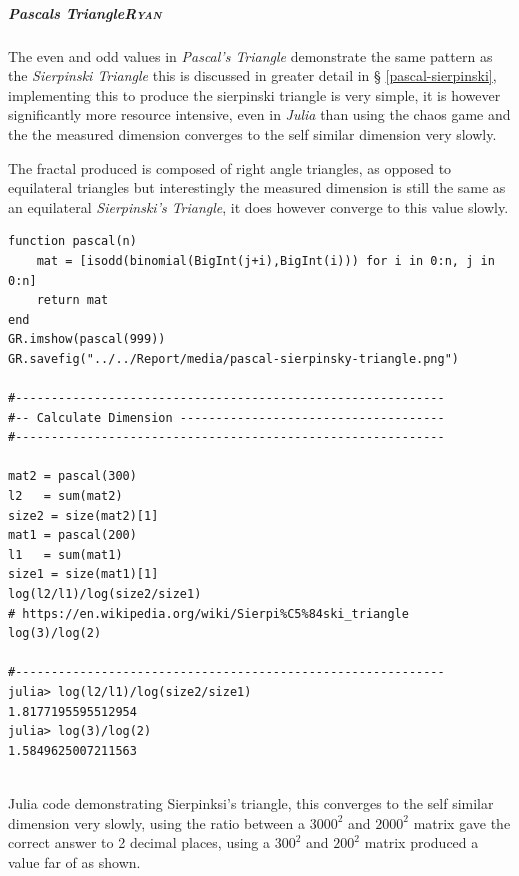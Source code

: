 \documentclass[a4paper,11pt,twoside]{article}
\begin{document}
\subparagraph{Pascals Triangle\hfill{}\textsc{Ryan}}
\label{pas-tri}
The even and odd values in \emph{Pascal's Triangle} demonstrate the same pattern as
the \emph{Sierpinski Triangle} this is discussed in greater detail in \S
\ref{pascal-sierpinski}, implementing this to produce the sierpinski triangle is very
simple, it is however significantly more resource intensive, even in \emph{Julia}
than using the chaos game and the the measured dimension converges to the self
similar dimension very slowly.

The fractal produced is composed of right angle triangles, as opposed to equilateral triangles but interestingly the measured dimension is still the same as an equilateral \emph{Sierpinski's Triangle}, it does however converge to this value slowly.

\begin{listing}[htbp]
\begin{verbatim}
function pascal(n)
    mat = [isodd(binomial(BigInt(j+i),BigInt(i))) for i in 0:n, j in 0:n]
    return mat
end
GR.imshow(pascal(999))
GR.savefig("../../Report/media/pascal-sierpinsky-triangle.png")

#------------------------------------------------------------
#-- Calculate Dimension -------------------------------------
#------------------------------------------------------------

mat2 = pascal(300)
l2   = sum(mat2)
size2 = size(mat2)[1]
mat1 = pascal(200)
l1   = sum(mat1)
size1 = size(mat1)[1]
log(l2/l1)/log(size2/size1)
# https://en.wikipedia.org/wiki/Sierpi%C5%84ski_triangle
log(3)/log(2)

#------------------------------------------------------------
julia> log(l2/l1)/log(size2/size1)
1.8177195595512954
julia> log(3)/log(2)
1.5849625007211563


\end{verbatim}
\caption{\label{pascal-triangle-sierpinski}Julia code demonstrating Sierpinksi's triangle, this converges to the self similar dimension very slowly, using the ratio between a \(3000^{2}\) and \(2000^{2}\) matrix gave the correct answer to 2 decimal places, using a \(300^{2}\) and \(200^{2}\) matrix produced a value far of as shown.}
\end{listing}


\newpage
\end{document}
